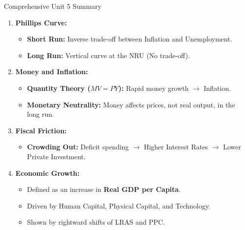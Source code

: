 \documentclass[aspectratio=169]{beamer}
\begin{document}
\begin{frame}{Comprehensive Unit 5 Summary}
    \begin{enumerate}
        \item \textbf{Phillips Curve:} 
        \begin{itemize}
            \item \textbf{Short Run:} Inverse trade-off between Inflation and Unemployment.
            \item \textbf{Long Run:} Vertical curve at the NRU (No trade-off).
        \end{itemize}
        
        \item \textbf{Money and Inflation:}
        \begin{itemize}
            \item \textbf{Quantity Theory ($MV=PY$):} Rapid money growth $\rightarrow$ Inflation.
            \item \textbf{Monetary Neutrality:} Money affects prices, not real output, in the long run.
        \end{itemize}
        
        \item \textbf{Fiscal Friction:}
        \begin{itemize}
            \item \textbf{Crowding Out:} Deficit spending $\rightarrow$ Higher Interest Rates $\rightarrow$ Lower Private Investment.
        \end{itemize}
        
        \item \textbf{Economic Growth:}
        \begin{itemize}
            \item Defined as an increase in \textbf{Real GDP per Capita}.
            \item Driven by Human Capital, Physical Capital, and Technology.
            \item Shown by rightward shifts of LRAS and PPC.
        \end{itemize}
    \end{enumerate}
\end{frame}
\end{document}
